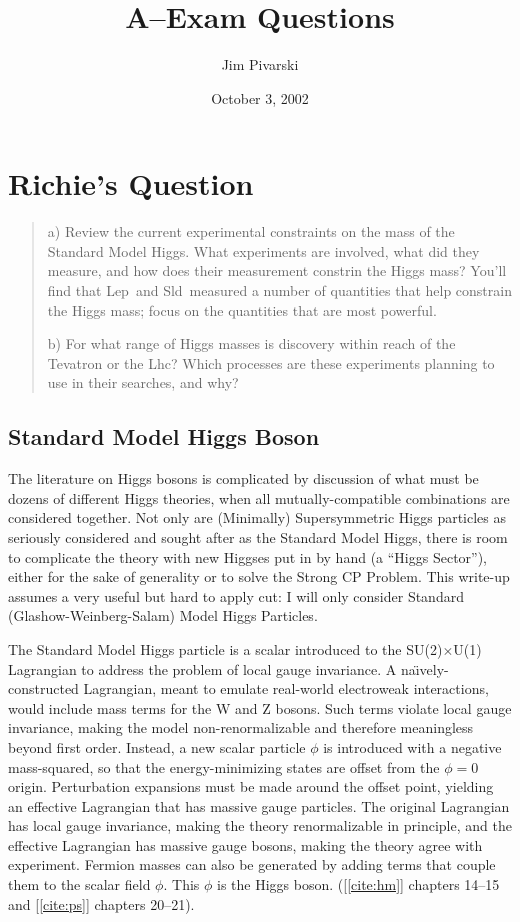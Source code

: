 \documentclass[12pt]{article}
\author{Jim Pivarski}
\date{October 3, 2002}
\title{A--Exam Questions}
\def\lep{{\sc Lep}}
\def\sld{{\sc Sld}}
\def\lhc{{\sc Lhc}}
\begin{document}
\setcounter{section}{1}

\section{Richie's Question}

\begin{quote}
a) Review the current experimental constraints on the mass of the
Standard Model Higgs. What experiments are involved, what did they
measure, and how does their measurement constrin the Higgs mass?
You'll find that \lep\ and \sld\ measured a number of quantities that
help constrain the Higgs mass; focus on the quantities that are most
powerful.

b) For what range of Higgs masses is discovery within reach of the
Tevatron or the \lhc? Which processes are these experiments planning to
use in their searches, and why?
\end{quote}

\subsection{Standard Model Higgs Boson}

The literature on Higgs bosons is complicated by discussion of what
must be dozens of different Higgs theories, when all
mutually-compatible combinations are considered together. Not only are
(Minimally) Supersymmetric Higgs particles as seriously considered and
sought after as the Standard Model Higgs, there is room to complicate
the theory with new Higgses put in by hand (a ``Higgs Sector''),
either for the sake of generality or to solve the Strong CP Problem.
This write-up assumes a very useful but hard to apply cut: I will only
consider Standard (Glashow-Weinberg-Salam) Model Higgs Particles.

The Standard Model Higgs particle is a scalar introduced to the
SU(2)$\times$U(1) Lagrangian to address the problem of local gauge
invariance. A na\"{\i}vely-constructed Lagrangian, meant to emulate
real-world electroweak interactions, would include mass terms for the
W and Z bosons. Such terms violate local gauge invariance, making the
model non-renormalizable and therefore meaningless beyond first order.
Instead, a new scalar particle $\phi$ is introduced with a negative
mass-squared, so that the energy-minimizing states are offset from the
$\phi=0$ origin. Perturbation expansions must be made around the
offset point, yielding an effective Lagrangian that has massive gauge
particles. The original Lagrangian has local gauge invariance, making
the theory renormalizable in principle, and the effective Lagrangian
has massive gauge bosons, making the theory agree with experiment.
Fermion masses can also be generated by adding terms that couple them
to the scalar field $\phi$. This $\phi$ is the Higgs boson.
([\ref{cite:hm}] chapters 14--15 and [\ref{cite:ps}] chapters 20--21).
\end{document}
